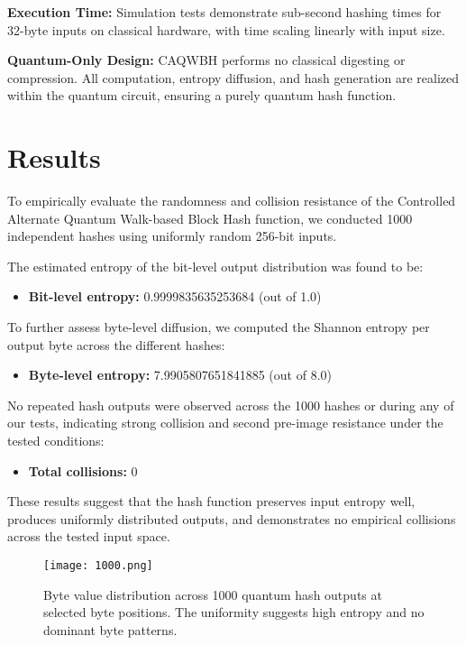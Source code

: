 \documentclass[conference]{IEEEtran}
\begin{document}
\textbf{Execution Time:} Simulation tests demonstrate sub-second hashing times for 32-byte inputs on classical hardware, with time scaling linearly with input size.

\textbf{Quantum-Only Design:} CAQWBH performs no classical digesting or compression. All computation, entropy diffusion, and hash generation are realized within the quantum circuit, ensuring a purely quantum hash function.

\section{Results}

To empirically evaluate the randomness and collision resistance of the Controlled Alternate Quantum Walk-based Block Hash function, we conducted 1000 independent hashes using uniformly random 256-bit inputs.

The estimated entropy of the bit-level output distribution was found to be:
\begin{itemize}
    \item \textbf{Bit-level entropy:} 0.9999835635253684 (out of 1.0)
\end{itemize}

To further assess byte-level diffusion, we computed the Shannon entropy per output byte across the different hashes:
\begin{itemize}
    \item \textbf{Byte-level entropy:}  7.9905807651841885 (out of 8.0)
\end{itemize}

No repeated hash outputs were observed across the 1000 hashes or during any of our tests, indicating strong collision and second pre-image resistance under the tested conditions:
\begin{itemize}
    \item \textbf{Total collisions:} 0
\end{itemize}

These results suggest that the hash function preserves input entropy well, produces uniformly distributed outputs, and demonstrates no empirical collisions across the tested input space.

\begin{figure}[!t]
    \centering
    \texttt{[image: 1000.png]}
    \caption{Byte value distribution across 1000 quantum hash outputs at selected byte positions. The uniformity suggests high entropy and no dominant byte patterns.}
    \label{fig:byte_distribution}
\end{figure}
\end{document}
